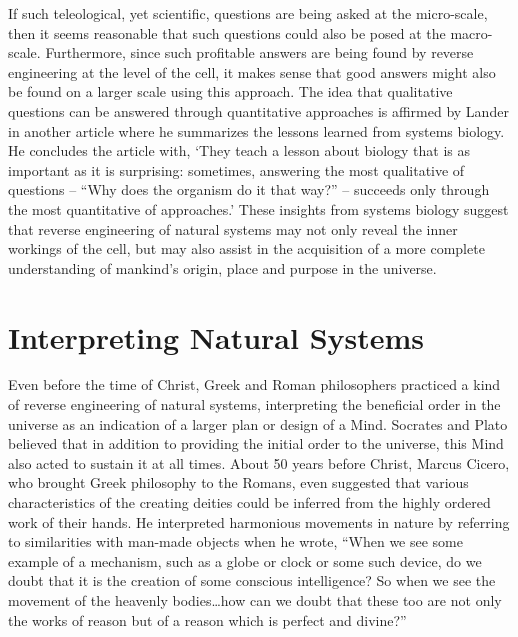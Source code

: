 If such teleological, yet scientific, questions are being asked at the
micro-scale, then it seems reasonable that such questions could also be
posed at the macro-scale. Furthermore, since such profitable answers
are being found by reverse engineering at the level of the cell, it
makes sense that good answers might also be found on a larger scale
using this approach. The idea that qualitative questions can be
answered through quantitative approaches is affirmed by Lander in
another article where he summarizes the lessons learned from systems
biology. He concludes the article with, `They teach a lesson about
biology that is as important as it is surprising: sometimes, answering
the most qualitative of questions – ``Why does the organism do it that
way?'' – succeeds only through the most quantitative of
approaches.'\citep{lander2007} These insights from systems biology
suggest that reverse engineering of natural systems may not only reveal
the inner workings of the cell, but may also assist in the acquisition
of a more complete understanding of mankind’s origin, place and purpose
in the universe.

\section{Interpreting Natural Systems}

Even before the time of Christ, Greek and Roman philosophers practiced a
kind of reverse engineering of natural systems, interpreting the
beneficial order in the universe as an indication of a larger plan or
design of a Mind.\citep{sedley2009} Socrates and Plato believed that
in addition to providing the initial order to the universe, this Mind
also acted to sustain it at all times. About 50 years before Christ,
Marcus Cicero, who brought Greek philosophy to the Romans, even
suggested that various characteristics of the creating deities could be
inferred from the highly ordered work of their hands. He interpreted
harmonious movements in nature by referring to similarities with
man-made objects when he wrote, “When we see some example of a
mechanism, such as a globe or clock or some such device, do we doubt
that it is the creation of some conscious intelligence? So when we see
the movement of the heavenly bodies…how can we doubt that these too are
not only the works of reason but of a reason which is perfect and
divine?”\citep[][pg. 89]{ciceronature}

